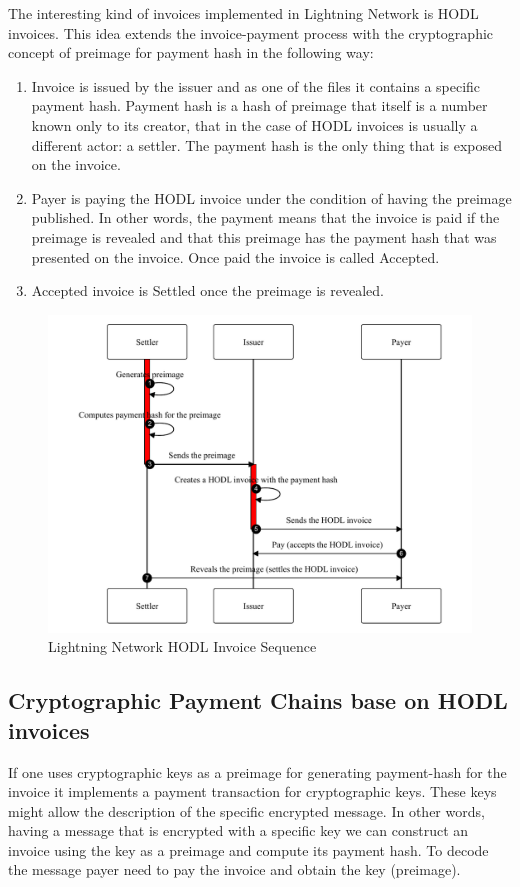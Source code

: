 \documentclass{article}
\begin{document}
The interesting kind of invoices implemented in Lightning Network is HODL invoices. This idea extends the invoice-payment process with the cryptographic concept of preimage for payment hash in the following way:
\begin{enumerate}
	\item Invoice is issued by the issuer and as one of the files it contains a specific payment hash. Payment hash is a hash of preimage that itself is a number known only to its creator, that in the case of HODL invoices is usually a different actor: a settler. The payment hash is the only thing that is exposed on the invoice.
	\item Payer is paying the HODL invoice under the condition of having the preimage published. In other words, the payment means that the invoice is paid if the preimage is revealed and that this preimage has the payment hash that was presented on the invoice. Once paid the invoice is called Accepted.
	\item Accepted invoice is Settled once the preimage is revealed.
\end{enumerate}


\begin{figure}
	\centering
	\includegraphics[scale=0.6]{LNDSequence.pdf}
	\caption{Lightning Network HODL Invoice Sequence}
	\label{fig:fr:lndsequence}
\end{figure}

\subsection{Cryptographic Payment Chains base on HODL invoices}
If one uses cryptographic keys as a preimage for generating payment-hash for the invoice it implements a payment transaction for cryptographic keys. These keys might allow the description of the specific encrypted message. In other words, having a message that is encrypted with a specific key we can construct an invoice using the key as a preimage and compute its payment hash. To decode the message payer need to pay the invoice and obtain the key (preimage).
\end{document}
